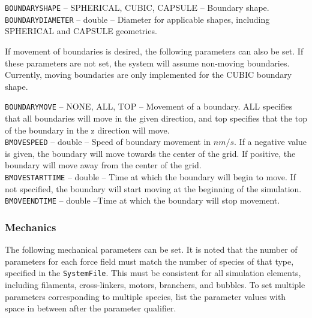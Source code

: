 \documentclass[11pt, oneside]{article}   	%
\begin{document}
\noindent \texttt{BOUNDARYSHAPE} -- SPHERICAL, CUBIC, CAPSULE -- Boundary shape. \\

\noindent \texttt{BOUNDARYDIAMETER} -- double -- Diameter for applicable shapes, including SPHERICAL and CAPSULE geometries.\\

\normalsize

\noindent If movement of boundaries is desired, the following parameters can also be set. If these parameters are not set, the system will assume non-moving boundaries. Currently, moving boundaries are only implemented for the CUBIC boundary shape. \\ 

\small 

\noindent \texttt{BOUNDARYMOVE} -- NONE, ALL, TOP -- Movement of a boundary. ALL specifies that all boundaries will move in the given direction, and top specifies that the top of the boundary in the z direction will move. \\
 
\noindent  \texttt{BMOVESPEED} -- double -- Speed of boundary movement in $nm / s$. If a negative value is given, the boundary will move towards the center of the grid. If positive, the boundary will move away from the center of the grid.\\
 
\noindent  \texttt{BMOVESTARTTIME} -- double -- Time at which the boundary will begin to move. If not specified, the boundary will start moving at the beginning of the simulation.\\
 
\noindent  \texttt{BMOVEENDTIME} -- double --Time at which the boundary will stop movement.\\ 
\normalsize
 

\subsubsection{Mechanics}

The following mechanical parameters can be set. It is noted that the number of parameters for each force field must match the number of species of that type, specified in the \texttt{SystemFile}. This must be consistent for all simulation elements, including filaments, cross-linkers, motors, branchers, and bubbles. To set multiple parameters corresponding to multiple species, list the parameter values with space in between after the parameter qualifier. \\
\end{document}

